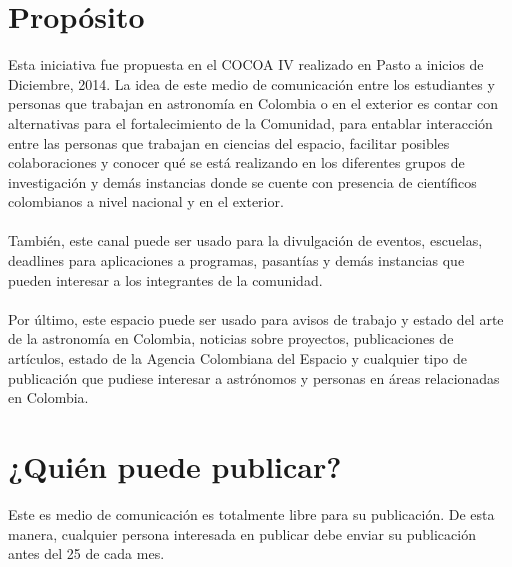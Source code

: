 \documentclass{book}
\begin{document}
\newcommand{\theimage}{fig11.jpg}
 

\section*{Propósito}
Esta iniciativa fue propuesta en el COCOA IV realizado en Pasto a inicios de Diciembre, 2014. La idea de este medio de comunicación entre los estudiantes y personas que trabajan en astronomía en Colombia o en el exterior es contar con alternativas para el fortalecimiento de la Comunidad, para entablar interacción entre las personas que trabajan en ciencias del  espacio, facilitar posibles colaboraciones y conocer qué se está realizando en los diferentes grupos de investigación y demás instancias donde se cuente con presencia de científicos colombianos a nivel nacional y en el exterior. \\
\\
También, este canal puede ser usado para la divulgación de eventos, escuelas, deadlines para aplicaciones a programas, pasantías y demás instancias que pueden interesar a los integrantes de la comunidad.  \\
\\
Por último, este espacio puede ser usado para avisos de trabajo y estado del arte de la astronomía en Colombia, noticias sobre proyectos, publicaciones de artículos, estado de la Agencia Colombiana del Espacio y cualquier tipo de publicación que pudiese interesar a astrónomos y personas en áreas relacionadas en Colombia.

\section*{¿Quién puede publicar?}
Este es medio de comunicación es totalmente libre para su publicación. De esta manera, cualquier persona interesada en publicar debe enviar su publicación antes del 25 de cada mes.

\end{document}
